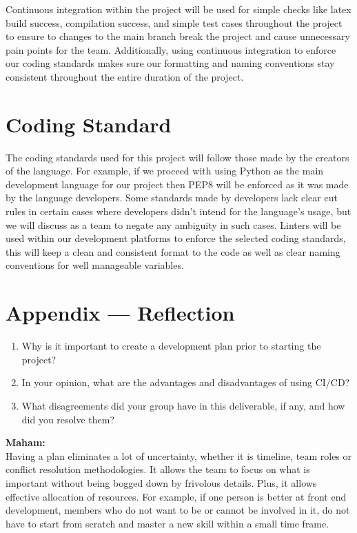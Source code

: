 \documentclass{article}
\begin{document}
Continuous integration within the project will be used for simple checks like latex build success, compilation success, and simple test cases throughout the project to ensure to changes to the main branch break the project and cause unnecessary pain points for the team. Additionally, using continuous integration to enforce our coding standards makes sure our formatting and naming conventions stay consistent throughout the entire duration of the project.

\section{Coding Standard}

The coding standards used for this project will follow those made by the creators of the language. For example, if we proceed with using Python as the main development language for our project then PEP8 will be enforced as it was made by the language developers. Some standards made by developers lack clear cut rules in certain cases where developers didn’t intend for the language’s usage, but we will discuss as a team to negate any ambiguity in such cases.
Linters will be used within our development platforms to enforce the selected coding standards, this will keep a clean and consistent format to the code as well as clear naming conventions for well manageable variables.

\newpage{}

\section*{Appendix --- Reflection}



\begin{enumerate}
    \item Why is it important to create a development plan prior to starting the
    project?
    \item In your opinion, what are the advantages and disadvantages of using
    CI/CD?
    \item What disagreements did your group have in this deliverable, if any,
    and how did you resolve them?
\end{enumerate}
\textbf{Maham:} \\
Having a plan eliminates a lot of uncertainty, whether it is timeline, team roles or conflict resolution methodologies. It allows the team to focus on what is important without being bogged down by frivolous details. Plus, it allows effective allocation of resources. For example, if one person is better at front end development, members who do not want to be or cannot be involved in it, do not have to start from scratch and master a new skill within a small time frame. 
\end{document}
